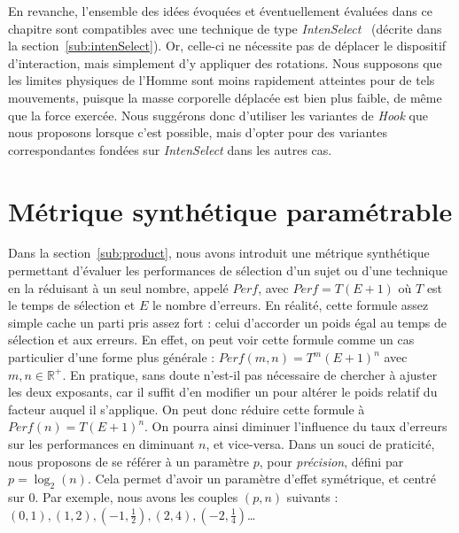 	En revanche, l'ensemble des idées évoquées et éventuellement évaluées dans ce chapitre sont compatibles avec une technique de type \emph{IntenSelect}~\cite{de2005intenselect} (décrite dans la section~\ref{sub:intenSelect}). Or, celle-ci ne nécessite pas de déplacer le dispositif d'interaction, mais simplement d'y appliquer des rotations. Nous supposons que les limites physiques de l'Homme sont moins rapidement atteintes pour de tels mouvements, puisque la masse corporelle déplacée est bien plus faible, de même que la force exercée. Nous suggérons donc d'utiliser les variantes de \emph{Hook} que nous proposons lorsque c'est possible, mais d'opter pour des variantes correspondantes fondées sur \emph{IntenSelect} dans les autres cas.
	
	\section{Métrique synthétique paramétrable}
	Dans la section~\ref{sub:product}, nous avons introduit une métrique synthétique permettant d'évaluer les performances de sélection d'un sujet ou d'une technique en la réduisant à un seul nombre, appelé $Perf$, avec $Perf = T(E+1)$ où $T$ est le temps de sélection et $E$ le nombre d'erreurs. En réalité, cette formule assez simple cache un parti pris assez fort : celui d'accorder un poids égal au temps de sélection et aux erreurs. En effet, on peut voir cette formule comme un cas particulier d'une forme plus générale : $Perf(m,n) = T^{m}(E+1)^{n}$ avec $m, n \in \mathbb{R}^{+}$. En pratique, sans doute n'est-il pas nécessaire de chercher à ajuster les deux exposants, car il suffit d'en modifier un pour altérer le poids relatif du facteur auquel il s'applique. On peut donc réduire cette formule à $Perf(n) = T(E+1)^{n}$. On pourra ainsi diminuer l'influence du taux d'erreurs sur les performances en diminuant $n$, et vice-versa. Dans un souci de praticité, nous proposons de se référer à un paramètre $p$, pour \emph{précision}, défini par $p = \log_2\left(n\right)$. Cela permet d'avoir un paramètre d'effet symétrique, et centré sur 0. Par exemple, nous avons les couples $(p,n)$ suivants : $\left(0,1\right), \left(1,2\right), \left(-1,\frac{1}{2}\right), \left(2,4\right), \left(-2,\frac{1}{4}\right)$\ldots{}
	
